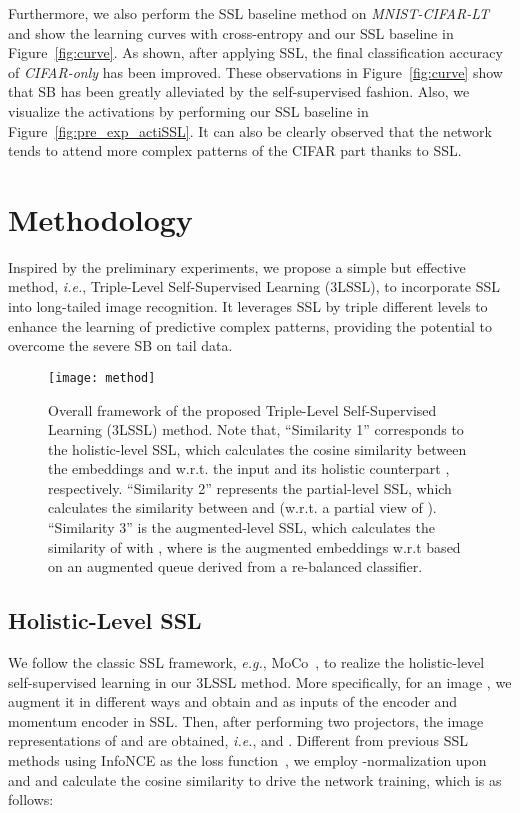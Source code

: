 \documentclass[10pt,journal,compsoc]{IEEEtran}
\newcommand{\eg}{\emph{e.g.}}
\newcommand{\ie}{\emph{i.e.}}
\begin{document}
Furthermore, we also perform the SSL baseline method on \emph{MNIST-CIFAR-LT} and show the learning curves with cross-entropy and our SSL baseline in Figure~\ref{fig:curve}. As shown, after applying SSL, the final classification accuracy of \emph{CIFAR-only} has been improved. These observations in Figure~\ref{fig:curve} show that SB has been greatly alleviated by the self-supervised fashion. Also, we visualize the activations by performing our SSL baseline in Figure~\ref{fig:pre_exp_actiSSL}. It can also be clearly observed that the network tends to attend more complex patterns of the CIFAR part thanks to SSL.



\section{Methodology}\label{sec:approach}

Inspired by the preliminary experiments, we propose a simple but effective method, \ie, Triple-Level Self-Supervised Learning ({3LSSL}), to incorporate SSL into long-tailed image recognition. It leverages SSL by triple different levels to enhance the learning of predictive complex patterns, providing the potential to overcome the severe SB on tail data.

\begin{figure*}[t!]
	\centering
	{\texttt{[image: method]}}
	\vspace{-0.75em}
	\caption{\small Overall framework of the proposed Triple-Level Self-Supervised Learning (3LSSL) method. Note that, ``Similarity 1'' corresponds to the holistic-level SSL, which calculates the cosine similarity between the embeddings  and  w.r.t. the input  and its holistic counterpart , respectively. ``Similarity 2'' represents the partial-level SSL, which calculates the similarity between  and  (w.r.t. a partial view of ). ``Similarity 3'' is the augmented-level SSL, which calculates the similarity of  with , where  is the augmented embeddings w.r.t  based on an augmented queue derived from a re-balanced classifier.}
	\label{fig:method}
\end{figure*}

\subsection{Holistic-Level SSL}

We follow the classic SSL framework, \eg, MoCo~\cite{He_2020_CVPR,mocov2}, to realize the holistic-level self-supervised learning in our 3LSSL method. More specifically, for an image , we augment it in different ways and obtain  and  as inputs of the encoder and momentum encoder in SSL. Then, after performing two projectors, the image representations of  and  are obtained, \ie,  and . Different from previous SSL methods using InfoNCE as the loss function~\cite{He_2020_CVPR,mocov2}, we employ -normalization upon  and  and calculate the cosine similarity to drive the network training, which is as follows:
\end{document}
